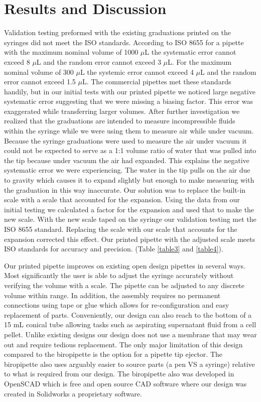 \documentclass[10pt,letterpaper]{article}
\begin{document}
\section*{Results and Discussion}
Validation testing preformed with the existing graduations printed on the syringes did not meet the ISO standards.
According to ISO 8655 for a pipette with the maximum nominal volume of 1000 $\mu$L the systematic error cannot exceed 8 $\mu$L and the random error cannot exceed 3 $\mu$L.
For the maximum nominal volume of 300 $\mu$L the systemic error cannot exceed 4 $\mu$L and the random error cannot exceed 1.5 $\mu$L.
The commercial pipettes met these standards handily, but in our initial tests with our printed pipette we noticed large negative systematic error suggesting that we were missing a biasing factor. 
This error was exaggerated while transferring larger volumes.
After further investigation we realized that the graduations are intended to measure incompressible fluids within the syringe while we were using them to measure air while under vacuum.
Because the syringe graduations were used to measure the air under vacuum it could not be expected to serve as a 1:1 volume ratio of water that was pulled into the tip because under vacuum the air had expanded.
This explains the negative systematic error we were experiencing.
The water in the tip pulls on the air due to gravity which causes it to expand slightly but enough to make measuring with the graduation in this way inaccurate.
Our solution was to replace the built-in scale with a scale that accounted for the expansion.
Using the data from our initial testing we calculated a factor for the expansion and used that to make the new scale.
With the new scale taped on the syringe our validation testing met the ISO 8655 standard.
Replacing the scale with our scale that accounts for the expansion corrected this effect. 
Our printed pipette with the adjusted scale meets ISO standards for accuracy and precision. (Table \ref{table3} and \ref{table4}).

Our printed pipette improves on existing open design pipettes in several ways. 
Most significantly the user is able to adjust the syringe accurately without verifying the volume with a scale.
The pipette can be adjusted to any discrete volume within range.
In addition, the assembly requires no permanent connections using tape or glue which allows for re-configuration and easy replacement of parts.
Conveniently, our design can also reach to the bottom of a 15 mL conical tube allowing tasks such as aspirating supernatant fluid from a cell pellet.
Unlike existing designs our design does not use a membrane that may wear out and require tedious replacement.
The only major limitation of this design compared to the biropipette is the option for a pipette tip ejector.
The biropipette also uses arguably easier to source parts (a pen VS a syringe) relative to what is required from our design.
The biropipette also was developed in OpenSCAD which is free and open source CAD software where our design was created in Solidworks a proprietary software. 
\end{document}

